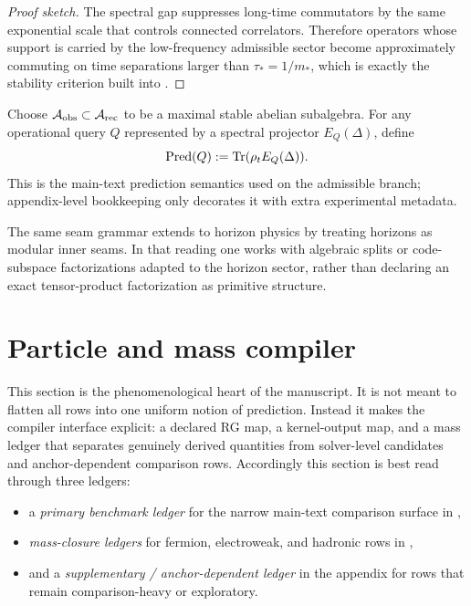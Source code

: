 \begin{proof}[Proof sketch]
The spectral gap suppresses long-time commutators by the same exponential scale that controls connected correlators. Therefore operators whose support is carried by the low-frequency admissible sector become approximately commuting on time separations larger than $\tau_*=1/m_*$, which is exactly the stability criterion built into .
\end{proof}

\begin{definition}
\label{def:observer-algebra-prediction}
Choose $\mathcal A_{\mathrm{obs}}\subset\mathcal A_{\mathrm{rec}}$ to be a maximal stable abelian subalgebra. For any operational query $Q$ represented by a spectral projector $E_Q(\Delta)$, define
\[
\operatorname{Pred}(Q):=\operatorname{Tr}(\rho_tE_Q(\Delta)).
\]
This is the main-text prediction semantics used on the admissible branch; appendix-level bookkeeping only decorates it with extra experimental metadata.
\end{definition}

\begin{remark}
The same seam grammar extends to horizon physics by treating horizons as modular inner seams. In that reading one works with algebraic splits or code-subspace factorizations adapted to the horizon sector, rather than declaring an exact tensor-product factorization as primitive structure.
\end{remark}

\section{Particle and mass compiler}

This section is the phenomenological heart of the manuscript. It is not meant to flatten all rows into one uniform notion of prediction. Instead it makes the compiler interface explicit: a declared RG map, a kernel-output map, and a mass ledger that separates genuinely derived quantities from solver-level candidates and anchor-dependent comparison rows.
Accordingly this section is best read through three ledgers:
\begin{itemize}[leftmargin=1.5em, topsep=3pt, itemsep=2pt]
    \item a \emph{primary benchmark ledger} for the narrow main-text comparison surface in ,
    \item \emph{mass-closure ledgers} for fermion, electroweak, and hadronic rows in ,
    \item and a \emph{supplementary / anchor-dependent ledger} in the appendix for rows that remain comparison-heavy or exploratory.
\end{itemize}


